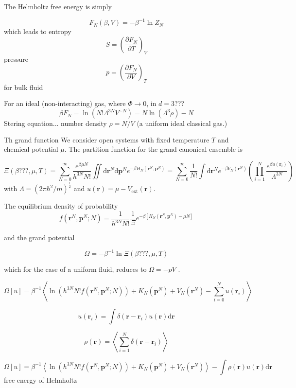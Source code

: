 The Helmholtz free energy is simply

\[
F_{N}(\beta,V)=-\beta^{-1}\ln Z_{N}
\]
which leads to entropy 
\[
S=\left(\dfrac{\partial F_{N}}{\partial T}\right)_{V}
\]
pressure
\[
p=\left(\dfrac{\partial F_{N}}{\partial V}\right)_{T}
\]
for bulk fluid

For an ideal (non-interacting) gas, where $\Phi\rightarrow0$, in
$d=3$???
\[
\beta F_{N}=\ln(N!\Lambda^{3N}V^{-N})=N\ln(\Lambda^{3}\rho)-N
\]
Stering equation... number density $\rho=N/V$ (a uniform ideal classical
gas.)

Th grand function We consider open systems with fixed temperature
$T$ and chemical potential $\mu$. The partition function for the
grand canonical ensemble is

\begin{equation}
\Xi(\beta???,\mu,T)=\sum_{N=0}^{\infty}\frac{e^{\beta\mu N}}{h^{3N}N!}\iint\mathrm{d}\mathbf{r}^{N}\mathrm{d}\mathbf{p}^{N}e^{-\beta H_{N}(\mathbf{r}^{N},\mathbf{p}^{N})}=\sum_{N=0}^{\infty}\frac{1}{N!}\int\mathrm{d}\mathbf{r}^{N}e^{-\beta V_{N}(\mathbf{r}^{N})}\left(\prod_{i=1}^{N}\frac{e^{\beta u(\mathbf{r}_{i})}}{\Lambda^{3N}}\right)
\end{equation}
with $\Lambda=(2\pi\hbar^{2}/m)^{\frac{1}{2}}$ and $u(\mathbf{r})=\mu-V_{\mathrm{ext}}(\mathbf{r})$.

The equilibrium density of probability 
\[
f(\mathbf{r}^{N},\mathbf{p}^{N};N)=\frac{1}{h^{3N}N!}\frac{1}{\Xi}e^{-\beta\left[H_{N}(\mathbf{r}^{N},\mathbf{p}^{N})-\mu N\right]}
\]


and the grand potential

\[
\Omega=-\beta^{-1}\ln\Xi(\beta???,\mu,T)
\]


which for the case of a uniform fluid, reduces to $\Omega=-pV$ . 

\[
\Omega\left[u\right]=\beta^{-1}\left\langle \ln\left(h^{3N}N!f(\mathbf{r}^{N},\mathbf{p}^{N};N)\right)+K_{N}(\mathbf{p}^{N})+V_{N}(\mathbf{r}^{N})-\sum_{i=0}^{N}u(\mathbf{r}_{i})\right\rangle 
\]


\[
u(\mathbf{r}_{i})=\int\delta(\mathbf{r}-\mathbf{r}_{i})u(\mathbf{r})\mathrm{d}\mathbf{r}
\]


\[
\rho(\mathbf{r})=\left\langle \sum_{i=1}^{N}\delta(\mathbf{r}-\mathbf{r}_{i})\right\rangle 
\]


\[
\Omega\left[u\right]=\beta^{-1}\left\langle \ln\left(h^{3N}N!f(\mathbf{r}^{N},\mathbf{p}^{N};N)\right)+K_{N}(\mathbf{p}^{N})+V_{N}(\mathbf{r}^{N})\right\rangle -\int\rho(\mathbf{r})u(\mathbf{r})\mathrm{d}\mathbf{r}
\]
free energy of Helmholtz

